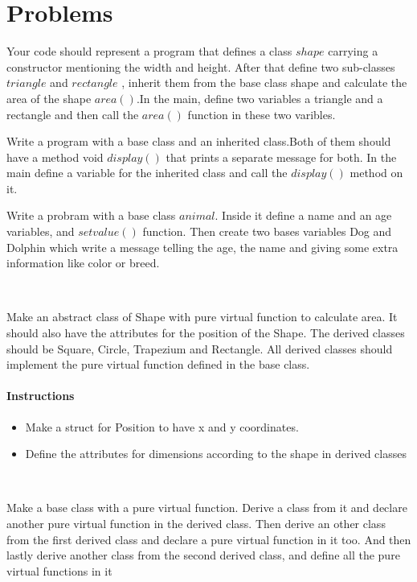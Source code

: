 \documentclass[11pt,fleqn]{book} %
\begin{document}
\section{Problems} 
\begin{problem}
Your code should represent a program that defines a class $shape$ carrying a constructor mentioning the width and height. After that define two sub-classes $triangle$ and $rectangle$ , inherit them from the base class shape and calculate the area of the shape $area()$.In the main, define two variables a triangle and a rectangle and then call the $area()$ function in these two varibles.\\
\end{problem}
\begin{problem}
Write a program with a base class and an inherited class.Both of them should have a method void $display()$ that prints a separate message for both. In the main define a variable for the inherited class and call the $display()$ method on it.\\
\end{problem}
\begin{problem}
Write a probram with a base class $animal$. Inside it define a name and an age variables, and $setvalue()$ function. Then create two bases variables Dog and Dolphin which write a message telling the age, the name and giving some extra information like color or breed.
\end{problem}~\\
\begin{problem}
	Make an abstract class of Shape with pure virtual function to calculate area. It should also have the attributes for the position of the Shape. The derived classes should be Square, Circle, Trapezium and Rectangle. All derived classes should implement the pure virtual function defined in the base class. 
	\paragraph{Instructions}
	\begin{itemize}
		\item Make a struct for Position to have x and y coordinates.
		\item Define the attributes for dimensions according to the shape in derived classes
	\end{itemize}
\end{problem} ~\\
\begin{problem}
	Make a base class with a pure virtual function. Derive a class from it and declare another pure virtual function in the derived class. Then derive an other class from the first derived class and declare a pure virtual function in it too. And then lastly derive another class from the second derived class, and define all the pure virtual functions in it
\end{problem}
 \newpage
\end{document}
